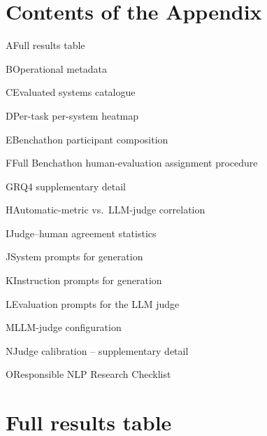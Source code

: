 \documentclass[11pt]{article}
\begin{document}
\section*{Contents of the Appendix}
\noindent
A\quad Full results table \dotfill \pageref{full-results-table}\par
B\quad Operational metadata \dotfill \pageref{operational-metadata}\par
C\quad Evaluated systems catalogue \dotfill \pageref{evaluated-systems-catalogue}\par
D\quad Per-task per-system heatmap \dotfill \pageref{per-task-per-system-heatmap}\par
E\quad Benchathon participant composition \dotfill \pageref{benchathon-participant-composition}\par
F\quad Full Benchathon human-evaluation assignment procedure \dotfill \pageref{full-benchathon-human-evaluation-assignment-procedure}\par
G\quad RQ4 supplementary detail \dotfill \pageref{rq4-supplementary}\par
H\quad Automatic-metric vs.\ LLM-judge correlation \dotfill \pageref{automatic-metric-vs.-llm-judge-correlation}\par
I\quad Judge--human agreement statistics \dotfill \pageref{judgehuman-agreement-statistics}\par
J\quad System prompts for generation \dotfill \pageref{system-prompts-for-generation}\par
K\quad Instruction prompts for generation \dotfill \pageref{instruction-prompts-for-generation}\par
L\quad Evaluation prompts for the LLM judge \dotfill \pageref{evaluation-prompts-for-the-llm-judge}\par
M\quad LLM-judge configuration \dotfill \pageref{llm-judge-configuration}\par
N\quad Judge calibration -- supplementary detail \dotfill \pageref{sec-judge-calibration-supplementary-detail}\par
O\quad Responsible NLP Research Checklist \dotfill \pageref{responsible-nlp-research-checklist}\par

\section{Full results table}\label{full-results-table}
\end{document}
